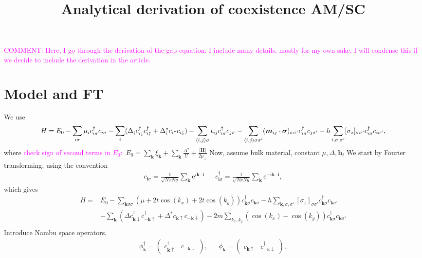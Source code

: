 \documentclass[aps,onecolumn,amsmath,amssymb,preprintnumbers,floatfix,prl,superscriptaddress,longbibliography]{revtex4-2}%
\newcommand{\e}[1]{\mathrm{e}^{#1}}
\newcommand{\hans}[1]{\textcolor{Magenta}{{#1}}}
\renewcommand\vec{\mathbf}
\begin{document}
\title{Analytical derivation of coexistence AM/SC}


\maketitle
\hans{COMMENT: Here, I go through the derivation of the gap equation. I include many details, mostly for my own sake. I will condense this if we decide to include the derivation in the article.}
\section{Model and FT}
We use
\begin{equation}
\label{eq:H}
		H = E_0
		- \sum_{i\sigma} \mu_i c^\dag_{i\sigma} c_{i\sigma}
		- \sum_i (\Delta_i^{\vphantom{*}} c^\dag_{i\downarrow} c^\dag_{i\uparrow} 
    + \Delta_i^* c_{i\uparrow} c_{i\downarrow}) 
		- \sum_{\langle i, j \rangle \sigma} t_{ij} c^\dag_{i\sigma} c_{j\sigma}
		- \sum_{\langle i, j \rangle \sigma\sigma'} (\bm{m}_{ij} \cdot \bm{\sigma})_{\sigma\sigma'} c^\dag_{i\sigma} c_{j\sigma'}
  - h
  \sum_{i, \sigma, \sigma'} [\sigma_z]_{\sigma\sigma'} c^\dag_{i\sigma} c_{i\sigma'},
\end{equation}
where \hans{check sign of second terms in $E_0:$} $E_0 = \sum_\vec{k} \xi_\vec{k} + \sum_\vec{k} \frac{\Delta ^2}{U} + \frac{|\vec H|}{2 \mu_+}$
Now, assume bulk material, constant $\mu, \Delta, \vec h_i$
We start by Fourier transforming, using the convention
\begin{align}
    c_{\vec i\sigma} = \frac{1}{\sqrt{NxNy}} \sum_{\vec k } \e{i \vec k \cdot \vec i}&&
    c^\dag_{\vec i\sigma} = \frac{1}{\sqrt{NxNy}} \sum_{\vec k } \e{-i \vec k \cdot \vec i},
\end{align}
which gives
\begin{align}
    H
		  =& E_0
		- \sum_{\vec k \sigma \sigma}(\mu + 2t \cos(k_x) + 2t \cos(k_y) ) c^\dag_{\vec k \sigma} c_{\vec k\sigma}
  - h
    \sum_{\vec k, \sigma, \sigma'} [\sigma_z]_{\sigma\sigma'} c^\dag_{\vec k \sigma} c_{\vec k \sigma'}
    \\
	&- \sum_{\vec k} (\Delta  c^\dag_{\vec k \downarrow} c^\dag_{-\vec k\uparrow} 
    + \Delta^* c_{\vec k\uparrow} c_{-\vec k\downarrow}) 
    -2m \sum_{k_x, k_y} (\cos(k_x) - \cos(k_y)) 
    c^\dag_{\vec k\sigma} c_{\vec k\sigma'}
    \\
\end{align}
Introduce Nambu space operators,
\begin{align}
    \phi_\vec{k}^\dag = 
    \begin{pmatrix}
        c^\dag_{\vec k \uparrow} 
        &
        c_{-\vec k \downarrow}
    \end{pmatrix},
    &&
    \phi_\vec{k} = 
    \begin{pmatrix}
        c_{\vec k \uparrow} 
        &
        c^\dag_{-\vec k \downarrow}
    \end{pmatrix},
\end{align}
\end{document}
